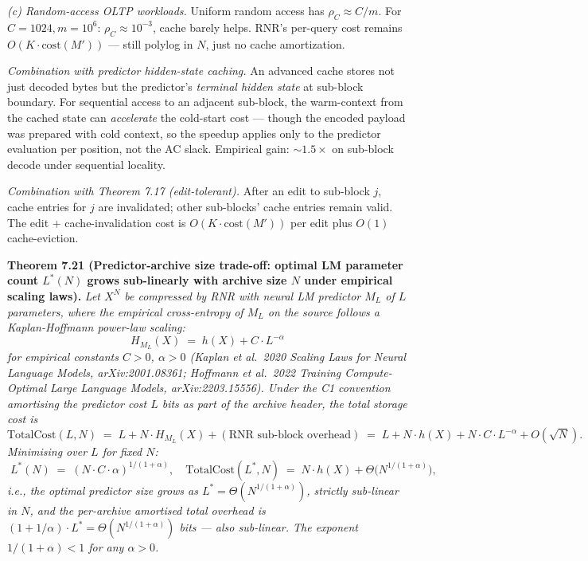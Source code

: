 \documentclass[
]{article}
\begin{document}
\emph{(c) Random-access OLTP workloads.} Uniform random access has
$\rho_C \approx C/m$. For $C = 1024, m = 10^6$: $\rho_C \approx
10^{-3}$, cache barely helps. RNR's per-query cost remains $O(K \cdot
\mathrm{cost}(M'))$ — still polylog in $N$, just no cache amortization.

\emph{Combination with predictor hidden-state caching.} An advanced
cache stores not just decoded bytes but the predictor's \emph{terminal
hidden state} at sub-block boundary. For sequential access to an
adjacent sub-block, the warm-context from the cached state can
\emph{accelerate} the cold-start cost — though the encoded payload
was prepared with cold context, so the speedup applies only to the
predictor evaluation per position, not the AC slack. Empirical gain:
$\sim 1.5\times$ on sub-block decode under sequential locality.

\emph{Combination with Theorem 7.17 (edit-tolerant).} After an edit
to sub-block $j$, cache entries for $j$ are invalidated; other
sub-blocks' cache entries remain valid. The edit + cache-invalidation
cost is $O(K \cdot \mathrm{cost}(M'))$ per edit plus $O(1)$
cache-eviction.

\textbf{Theorem 7.21 (Predictor-archive size trade-off: optimal LM
parameter count $L^*(N)$ grows sub-linearly with archive size $N$
under empirical scaling laws).}
\emph{Let $X^N$ be compressed by RNR with neural LM predictor $M_L$
of $L$ parameters, where the empirical cross-entropy of $M_L$ on the
source follows a Kaplan-Hoffmann power-law scaling:}
\[
H_{M_L}(X) \;=\; h(X) + C \cdot L^{-\alpha}
\]
\emph{for empirical constants $C > 0$, $\alpha > 0$ (Kaplan et al.\ 2020
\emph{Scaling Laws for Neural Language Models}, arXiv:2001.08361;
Hoffmann et al.\ 2022 \emph{Training Compute-Optimal Large Language
Models}, arXiv:2203.15556). Under the C1 convention amortising the
predictor cost $L$ bits as part of the archive header, the total
storage cost is}
\[
\mathrm{TotalCost}(L, N) \;=\; L + N \cdot H_{M_L}(X) + (\text{RNR sub-block overhead})
\;=\; L + N \cdot h(X) + N \cdot C \cdot L^{-\alpha} + O(\sqrt{N}).
\]
\emph{Minimising over $L$ for fixed $N$:}
\[
\boxed{
\;
L^*(N) \;=\; (N \cdot C \cdot \alpha)^{1/(1+\alpha)},
\quad
\mathrm{TotalCost}(L^*, N) \;=\; N \cdot h(X) + \Theta\bigl(N^{1/(1+\alpha)}\bigr),
\;
}
\]
\emph{i.e., the optimal predictor size grows as $L^* = \Theta(N^{1/(1+\alpha)})$,
strictly sub-linear in $N$, and the per-archive amortised total overhead
is $(1 + 1/\alpha) \cdot L^* = \Theta(N^{1/(1+\alpha)})$ bits — also
sub-linear. The exponent $1/(1+\alpha) < 1$ for any $\alpha > 0$.}
\end{document}
